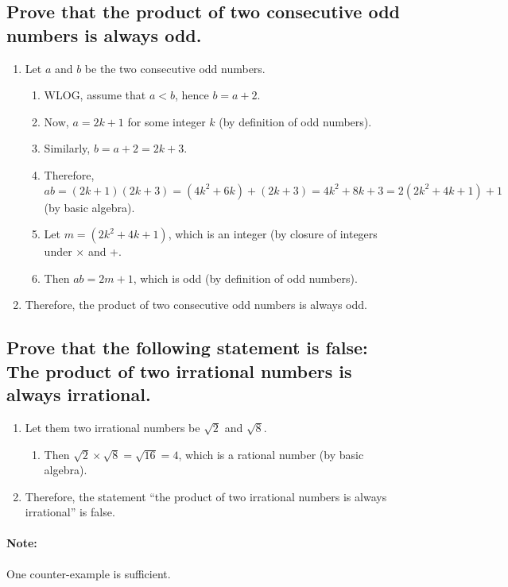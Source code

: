 \documentclass{article}
\begin{document}
\subsection*{Prove that the product of two consecutive odd numbers is always odd.}
\begin{enumerate}
    \item Let $a$ and $b$ be the two consecutive odd numbers. 
    \begin{enumerate}
        \item WLOG, assume that $a<b$, hence $b=a+2$.
        \item Now, $a=2k+1$ for some integer $k$ (by definition of odd numbers).
        \item Similarly, $b=a+2=2k+3$.
        \item Therefore, $ab=(2k+1)(2k+3)=(4k^2+6k)+(2k+3)=4k^2+8k+3=2(2k^2+4k+1)+1$ (by basic algebra).
        \item Let $m=(2k^2+4k+1)$, which is an integer (by closure of integers under $\times$ and +. 
        \item Then $ab=2m+1$, which is odd (by definition of odd numbers).
    \end{enumerate}
    \item Therefore, the product of two consecutive odd numbers is always odd.
\end{enumerate}
\vspace{0.1cm}

\subsection*{Prove that the following statement is false: The product of two irrational numbers is always irrational.}
\begin{enumerate}
    \item Let them two irrational numbers be $\sqrt{2}$ and $\sqrt{8}$. 
    \begin{enumerate}
        \item Then $\sqrt{2}\times\sqrt{8}=\sqrt{16}=4$, which is a rational number (by basic algebra).
    \end{enumerate}
    \item Therefore, the statement ``the product of two irrational numbers is always irrational'' is false.
\end{enumerate}
\paragraph{Note:}One counter-example is sufficient. 
\vspace{0.1cm}
\end{document}
